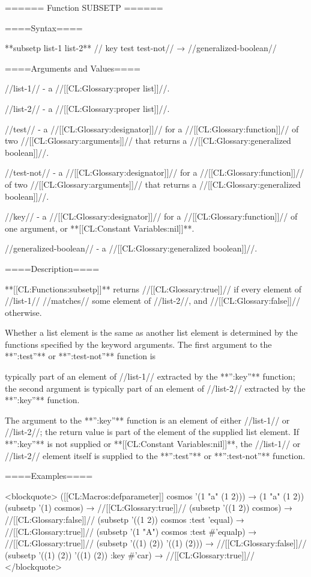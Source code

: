 ====== Function SUBSETP ======

====Syntax====

**subsetp {list-1 list-2** //\key} key test test-not// → //generalized-boolean//

====Arguments and Values====

//list-1// - a //[[CL:Glossary:proper list]]//.

//list-2// - a //[[CL:Glossary:proper list]]//.

//test// - a //[[CL:Glossary:designator]]// for a //[[CL:Glossary:function]]// of two //[[CL:Glossary:arguments]]// that returns a //[[CL:Glossary:generalized boolean]]//.

//test-not// - a //[[CL:Glossary:designator]]// for a //[[CL:Glossary:function]]// of two //[[CL:Glossary:arguments]]// that returns a //[[CL:Glossary:generalized boolean]]//.

//key// - a //[[CL:Glossary:designator]]// for a //[[CL:Glossary:function]]// of one argument, or **[[CL:Constant Variables:nil]]**.

//generalized-boolean// - a //[[CL:Glossary:generalized boolean]]//.

====Description====

**[[CL:Functions:subsetp]]** returns //[[CL:Glossary:true]]// if every element of //list-1// //matches// some element of //list-2//, and //[[CL:Glossary:false]]// otherwise.

Whether a list element is the same as another list element is determined by the functions specified by the keyword arguments. The first argument to the **'':test''** or **'':test-not''** function is

typically part of an element of //list-1// extracted by the **'':key''** function; the second argument is typically part of an element of //list-2// extracted by the **'':key''** function.

The argument to the **'':key''** function is an element of either //list-1// or //list-2//; the return value is part of the element of the supplied list element. If **'':key''** is not supplied or **[[CL:Constant Variables:nil]]**, the //list-1// or //list-2// element itself is supplied to the **'':test''** or **'':test-not''** function.

====Examples====

<blockquote> ([[CL:Macros:defparameter]] cosmos '(1 "a" (1 2))) → (1 "a" (1 2)) (subsetp '(1) cosmos) → //[[CL:Glossary:true]]// (subsetp '((1 2)) cosmos) → //[[CL:Glossary:false]]// (subsetp '((1 2)) cosmos :test 'equal) → //[[CL:Glossary:true]]// (subsetp '(1 "A") cosmos :test #'equalp) → //[[CL:Glossary:true]]// (subsetp '((1) (2)) '((1) (2))) → //[[CL:Glossary:false]]// (subsetp '((1) (2)) '((1) (2)) :key #'car) → //[[CL:Glossary:true]]// </blockquote>


